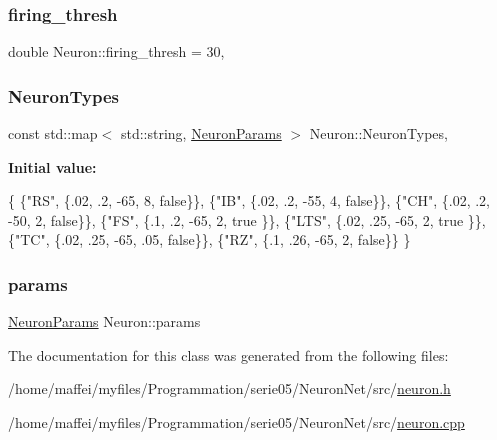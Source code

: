\mbox{\label{classNeuron_a9173cec15070307b635e58f976113ad7}} 
\subsubsection{\texorpdfstring{firing\+\_\+thresh}{firing\_thresh}}
{\footnotesize\ttfamily double Neuron\+::firing\+\_\+thresh = 30\hspace{0.3cm}{\ttfamily [static]}, {\ttfamily [private]}}

\mbox{\label{classNeuron_ab4b47274e756b72923d2f8a9a5037d23}} 
\subsubsection{\texorpdfstring{Neuron\+Types}{NeuronTypes}}
{\footnotesize\ttfamily const std\+::map$<$ std\+::string, \hyperlink{structNeuronParams}{Neuron\+Params} $>$ Neuron\+::\+Neuron\+Types\hspace{0.3cm}{\ttfamily [static]}, {\ttfamily [private]}}

{\bfseries Initial value\+:}
\begin{DoxyCode}
\{
    \{\textcolor{stringliteral}{"RS"},  \{.02, .2,  -65, 8,   \textcolor{keyword}{false}\}\},
    \{\textcolor{stringliteral}{"IB"},  \{.02, .2,  -55, 4,   \textcolor{keyword}{false}\}\},
    \{\textcolor{stringliteral}{"CH"},  \{.02, .2,  -50, 2,   \textcolor{keyword}{false}\}\},
    \{\textcolor{stringliteral}{"FS"},  \{.1,  .2,  -65, 2,   \textcolor{keyword}{true} \}\},
    \{\textcolor{stringliteral}{"LTS"}, \{.02, .25, -65, 2,   \textcolor{keyword}{true} \}\},
    \{\textcolor{stringliteral}{"TC"},  \{.02, .25, -65, .05, \textcolor{keyword}{false}\}\},
    \{\textcolor{stringliteral}{"RZ"},  \{.1,  .26, -65, 2,   \textcolor{keyword}{false}\}\}
\}
\end{DoxyCode}
\mbox{\label{classNeuron_a9427965b6669c7c35c327689de7a4d63}} 
\subsubsection{\texorpdfstring{params}{params}}
{\footnotesize\ttfamily \hyperlink{structNeuronParams}{Neuron\+Params} Neuron\+::params\hspace{0.3cm}{\ttfamily [private]}}



The documentation for this class was generated from the following files\+:\begin{DoxyCompactItemize}
\item 
/home/maffei/myfiles/\+Programmation/serie05/\+Neuron\+Net/src/\hyperlink{neuron_8h}{neuron.\+h}\item 
/home/maffei/myfiles/\+Programmation/serie05/\+Neuron\+Net/src/\hyperlink{neuron_8cpp}{neuron.\+cpp}\end{DoxyCompactItemize}
